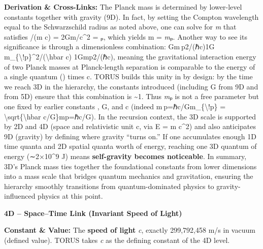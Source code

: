 \documentclass[
]{article}
\begin{document}
\textbf{Derivation \& Cross-Links:} The Planck mass is determined by
lower-level constants together with gravity (9D). In fact, by setting
the Compton wavelength equal to the Schwarzschild radius as noted above,
one can solve for \emph{m} that satisfies \hbar/(m c) = 2Gm/c\^{}2 =
\emph{\ell}ₚ, which yields m = \emph{m}ₚ\hspace{0pt}. Another way to see
its significance is through a dimensionless combination: Gm ⁣p2/(ℏc)\approx1G
m\_\{\textbackslash!p\}\^{}2/(\textbackslash hbar c) \approx
1Gmp2\hspace{0pt}/(ℏc)\hspace{0pt}, meaning the gravitational
interaction energy of two Planck masses at Planck-length separation is
comparable to the energy of a single quantum (\hbar) times c. TORUS builds
this unity in by design: by the time we reach 3D in the hierarchy, the
constants introduced (including G from 9D and \hbar from 5D) ensure that
this combination is \textasciitilde1\hspace{0pt}. Thus \emph{m}ₚ is not
a free parameter but one fixed by earlier constants \hbar, G, and c (indeed
m ⁣p=ℏc/Gm\_\{\textbackslash!p\} =
\textbackslash sqrt\{\textbackslash hbar
c/G\}mp\hspace{0pt}=ℏc/G\hspace{0pt}). In the recursion context, the 3D
scale is supported by 2D and 4D (space and relativistic unit c, via E =
m c\^{}2) and also anticipates 9D (gravity) by defining where gravity
``turns on.'' If one accumulates enough 1D time quanta and 2D spatial
quanta worth of energy, reaching one 3D quantum of energy (∼2×10\^{}9 J)
means \textbf{self-gravity becomes noticeable}\hspace{0pt}. In summary,
3D's Planck mass ties together the foundational constants from lower
dimensions into a mass scale that bridges quantum mechanics and
gravitation, ensuring the hierarchy smoothly transitions from
quantum-dominated physics to gravity-influenced physics at this point.

\textbf{4D -- Space--Time Link (Invariant Speed of Light)}

\textbf{Constant \& Value:} The \textbf{speed of light} \emph{c},
exactly 299,792,458 m/s in vacuum (defined value)\hspace{0pt}. TORUS
takes \emph{c} as the defining constant of the 4D level.
\end{document}
